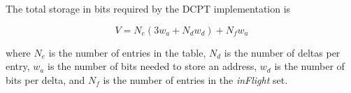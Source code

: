 The total storage in bits required by the DCPT implementation is

\begin{equation*}
V = N_e (3 w_a + N_d w_d) + N_f w_a
\end{equation*} 

where $N_e$ is the number of entries in the table, $N_d$ is the number of deltas
per entry, $w_a$ is the number of bits needed to store an address, $w_d$ is the
number of bits per delta, and $N_f$ is the number of entries in the \emph{inFlight}
set.

